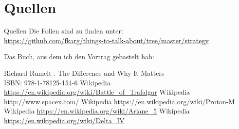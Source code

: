 \section{Quellen}
\begin{frame}{Quellen}
    Die Folien sind zu finden unter: \\
    \url{https://github.com/fkarg/things-to-talk-about/tree/master/strategy}


    Das Buch, aus dem ich den Vortrag gebastelt hab:

    \begin{thebibliography}{10}
    \beamertemplatebookbibitems
        Richard Rumelt
        .
        \newblock The Difference and Why It Matters \\
                  ISBN: 978-1-78125-154-6
    \beamertemplatearticlebibitems
        Wikipedia
            \newblock \url{https://en.wikipedia.org/wiki/Battle\_of\_Trafalgar}
        Wikipedia
            \newblock \url{http://www.spacex.com/}
        Wikipedia
            \newblock \url{https://en.wikipedia.org/wiki/Proton-M}
        Wikipedia
            \newblock \url{https://en.wikipedia.org/wiki/Ariane\_5}
        Wikipedia
            \newblock \url{https://en.wikipedia.org/wiki/Delta\_IV}
    \end{thebibliography}

\end{frame}


